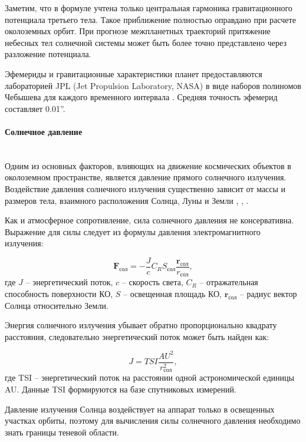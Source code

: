 Заметим, что в формуле учтена только центральная гармоника гравитационного потенциала третьего тела.
Такое приближение полностью оправдано при расчете околоземных орбит.
При прогнозе межпланетных траекторий притяжение небесных тел солнечной системы может быть 
более точно представлено через разложение потенциала.

Эфемериды и гравитационные характеристики планет предоставляются лабораторией JPL 
(Jet Propulsion Laboratory, NASA) в виде наборов полиномов Чебышева для
каждого временного интервала \cite{standish1998}. Средняя точность эфемерид составляет 0.01''.

\newpage
\paragraph{Солнечное давление} \mbox{} \\

Одним из основных факторов, влияющих на движение космических объектов в околоземном пространстве, является давление прямого солнечного излучения. Воздействие
давления солнечного излучения существенно зависит от массы и размеров тела, взаимного
расположения Солнца, Луны и Земли \cite{Musen1960}, \cite{Parkinson1960}, \cite{Vallado2013-ee}.

Как и атмосферное сопротивление, сила солнечного давления не консервативна. Выражение для силы следует из формулы давления
электромагнитного излучения:

\begin{equation*}
    \mathbf{F}_{\text{сол}} = -\frac{J}{c} C_R S_{\text{сол}} \frac{\mathbf{r}_{\text{сол}}}{r_{\text{сол}}},
\end{equation*}
где $J$ -- энергетический поток, $c$ -- скорость света,
$C_R$ -- отражательная способность поверхности КО,
$S$ -- освещенная площадь КО,
$\mathbf{r}_{\text{сол}}$ -- радиус вектор Солнца относительно Земли.

Энергия солнечного излучения убывает обратно пропорционально квадрату расстояния, следовательно
энергетический поток может быть найден как:

\begin{equation*}
    J = TSI \frac{AU^2}{r^2_{\text{сол}}},
\end{equation*}
где TSI -- энергетический поток на расстоянии одной астрономической единицы AU.
Данные TSI формируются на базе спутниковых измерений.

Давление излучения Солнца воздействует на аппарат только в освещенных участках орбиты,
поэтому для вычисления силы солнечного давления необходимо знать границы теневой области.


